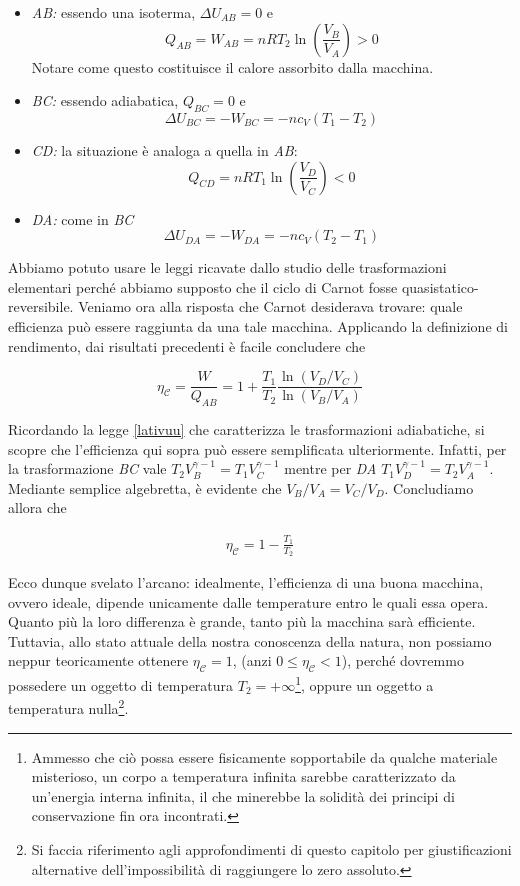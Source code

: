 \begin{itemize}
    \item \textit{AB:} essendo una isoterma, $\Delta U_{AB} = 0$ e
    \[ Q_{AB} = W_{AB} = nRT_2\ln\left(\frac{V_B}{V_A}\right) > 0 \]
    Notare come questo costituisce il calore assorbito dalla macchina.

    \item \textit{BC:} essendo adiabatica, $Q_{BC} = 0$ e
    \[ \Delta U_{BC} = -W_{BC} = -nc_V(T_1 - T_2) \]

    \item \textit{CD:} la situazione è analoga a quella in \textit{AB}:
    \[ Q_{CD} = nRT_1\ln\left(\frac{V_D}{V_C}\right) < 0 \]

    \item \textit{DA:} come in \textit{BC}
    \[ \Delta U_{DA} = -W_{DA} = -nc_V(T_2 - T_1) \]
\end{itemize}

\noindent Abbiamo potuto usare le leggi ricavate dallo studio delle
trasformazioni elementari perché abbiamo supposto che il ciclo di
Carnot fosse quasistatico-reversibile. Veniamo ora alla risposta che
Carnot desiderava trovare: quale efficienza può essere raggiunta da
una tale macchina. Applicando la definizione di rendimento, dai
risultati precedenti è facile concludere che

\[ \eta_\mathcal{C} = \frac{W}{Q_{AB}} = 1 + \frac{T_1}{T_2}\frac{\ln(V_D/V_C)}{\ln(V_B/V_A)} \]

\noindent Ricordando la legge \ref{lativuu} che caratterizza le
trasformazioni adiabatiche, si scopre che l'efficienza qui sopra può
essere semplificata ulteriormente. Infatti, per la trasformazione
\textit{BC} vale $T_2V_B^{\gamma - 1} = T_1V_C^{\gamma - 1}$ mentre
per \textit{DA} $T_1V_D^{\gamma - 1} = T_2V_A^{\gamma - 1}$. Mediante
semplice algebretta, è evidente che $V_B/V_A = V_C/V_D$. Concludiamo
allora che

\begin{align}
    \eta_\mathcal{C} = 1 - \frac{T_1}{T_2}
\end{align}

Ecco dunque svelato l'arcano: idealmente, l'efficienza di una buona
macchina, ovvero ideale, dipende unicamente dalle temperature entro
le quali essa opera. Quanto più la loro differenza è grande, tanto
più la macchina sarà efficiente. Tuttavia, allo stato attuale della
nostra conoscenza della natura, non possiamo neppur teoricamente
ottenere $\eta_\mathcal{C} = 1$, (anzi $0 \leq \eta_\mathcal{C} < 1$),
perché dovremmo possedere un oggetto di temperatura $T_2 = +\infty$\footnote{Ammesso che ciò possa essere fisicamente sopportabile da qualche materiale misterioso, un corpo a temperatura infinita sarebbe
caratterizzato da un'energia interna infinita, il che minerebbe la
solidità dei principi di conservazione fin ora incontrati.},
oppure un oggetto a temperatura nulla\footnote{Si faccia
riferimento agli approfondimenti di questo capitolo per giustificazioni
alternative dell'impossibilità di raggiungere lo zero assoluto.}.

